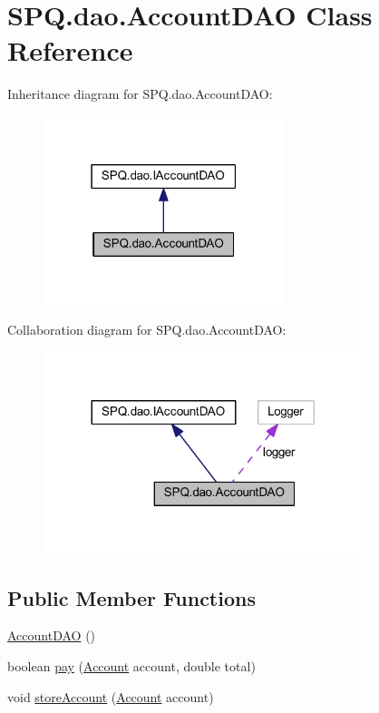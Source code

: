 \hypertarget{class_s_p_q_1_1dao_1_1_account_d_a_o}{}\section{S\+P\+Q.\+dao.\+Account\+D\+AO Class Reference}
\label{class_s_p_q_1_1dao_1_1_account_d_a_o}


Inheritance diagram for S\+P\+Q.\+dao.\+Account\+D\+AO\+:\nopagebreak
\begin{figure}[H]
\begin{center}
\leavevmode
\includegraphics[width=199pt]{class_s_p_q_1_1dao_1_1_account_d_a_o__inherit__graph}
\end{center}
\end{figure}


Collaboration diagram for S\+P\+Q.\+dao.\+Account\+D\+AO\+:\nopagebreak
\begin{figure}[H]
\begin{center}
\leavevmode
\includegraphics[width=264pt]{class_s_p_q_1_1dao_1_1_account_d_a_o__coll__graph}
\end{center}
\end{figure}
\subsection*{Public Member Functions}
\begin{DoxyCompactItemize}
\item 
\mbox{\hyperlink{class_s_p_q_1_1dao_1_1_account_d_a_o_a8de4c4bcd808ea5ea2b9fdbc741e49ea}{Account\+D\+AO}} ()
\item 
boolean \mbox{\hyperlink{class_s_p_q_1_1dao_1_1_account_d_a_o_ad40cd6129f180d4cb235c00756b53930}{pay}} (\mbox{\hyperlink{class_s_p_q_1_1data_1_1_account}{Account}} account, double total)
\item 
void \mbox{\hyperlink{class_s_p_q_1_1dao_1_1_account_d_a_o_abe750b9b11a2c7d398c4d8676b053f99}{store\+Account}} (\mbox{\hyperlink{class_s_p_q_1_1data_1_1_account}{Account}} account)
\end{DoxyCompactItemize}


